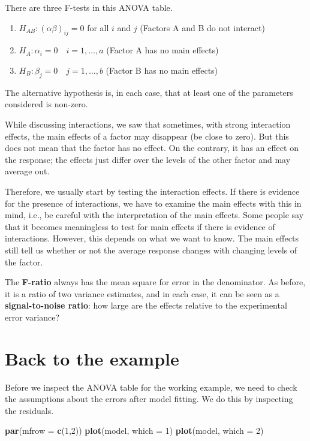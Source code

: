 \documentclass[
  letterpaper,
]{book}
\newenvironment{Shaded}{\begin{snugshade}}{\end{snugshade}}
\newcommand{\AttributeTok}[1]{\textcolor[rgb]{0.13,0.29,0.53}{#1}}
\newcommand{\DecValTok}[1]{\textcolor[rgb]{0.00,0.00,0.81}{#1}}
\newcommand{\FunctionTok}[1]{\textcolor[rgb]{0.13,0.29,0.53}{\textbf{#1}}}
\newcommand{\NormalTok}[1]{#1}
\providecommand{\tightlist}{%
  \setlength{\itemsep}{0pt}\setlength{\parskip}{0pt}}\usepackage{longtable,booktabs,array}
\begin{document}
There are three F-tests in this ANOVA table.

\begin{enumerate}
\def\labelenumi{\arabic{enumi}.}
\tightlist
\item
  \(H_{AB} : (\alpha\beta)_{ij} = 0\) for all \(i\) and \(j\) (Factors A
  and B do not interact)
\item
  \(H_A : \alpha_i = 0 \quad i = 1, \dots, a\) (Factor A has no main
  effects)
\item
  \(H_B : \beta_j = 0 \quad j = 1, \dots, b\) (Factor B has no main
  effects)
\end{enumerate}

The alternative hypothesis is, in each case, that at least one of the
parameters considered is non-zero.

While discussing interactions, we saw that sometimes, with strong
interaction effects, the main effects of a factor may disappear (be
close to zero). But this does not mean that the factor has no effect. On
the contrary, it has an effect on the response; the effects just differ
over the levels of the other factor and may average out.

Therefore, we usually start by testing the interaction effects. If there
is evidence for the presence of interactions, we have to examine the
main effects with this in mind, i.e., be careful with the interpretation
of the main effects. Some people say that it becomes meaningless to test
for main effects if there is evidence of interactions. However, this
depends on what we want to know. The main effects still tell us whether
or not the average response changes with changing levels of the factor.

The \textbf{F-ratio} always has the mean square for error in the
denominator. As before, it is a ratio of two variance estimates, and in
each case, it can be seen as a \textbf{signal-to-noise ratio}: how large
are the effects relative to the experimental error variance?

\section{Back to the example}\label{back-to-the-example-1}

Before we inspect the ANOVA table for the working example, we need to
check the assumptions about the errors after model fitting. We do this
by inspecting the residuals.

\begin{Shaded}
\begin{Highlighting}[]
\FunctionTok{par}\NormalTok{(}\AttributeTok{mfrow =} \FunctionTok{c}\NormalTok{(}\DecValTok{1}\NormalTok{,}\DecValTok{2}\NormalTok{))}
\FunctionTok{plot}\NormalTok{(model, }\AttributeTok{which =} \DecValTok{1}\NormalTok{)}
\FunctionTok{plot}\NormalTok{(model, }\AttributeTok{which =} \DecValTok{2}\NormalTok{)}
\end{Highlighting}
\end{Shaded}
\end{document}
